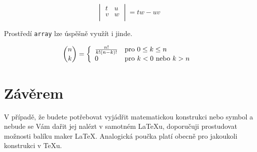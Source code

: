\documentclass[11pt]{article}
\theoremstyle{definition}
\theoremstyle{plain}
\begin{document}
\begin{multicols*}{2}
	\begin{equation}
		\begin{vmatrix}
		t & u\\
		v & w\\
		\end{vmatrix} = tw - uv\nonumber
	\end{equation}


	
Prostředí \texttt{array} lze úspěšně využít i jinde.

	$$ \binom{n}{k} =
	\left\{
		\begin{array}{l l}
			\frac{n!}{k!(n-k)!} & \text{pro } 0 \leq k \leq n \\
			0 & \text{pro } k < 0 \text{ nebo } k > n
		\end{array}
	\right. $$

	\section{Závěrem}

V případě, že budete potřebovat vyjádřit matematickou konstrukci nebo symbol a nebude se Vám dařit jej nalézt v samotném \LaTeX u, doporučuji prostudovat možnosti balíku maker \AmS\LaTeX.
Analogická poučka platí obecně pro jakoukoli konstrukci v \TeX u.
	
	
	

	\end{multicols*}
\end{document}
